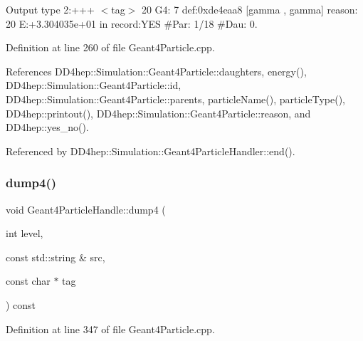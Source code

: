 Output type 2\+:+++ $<$tag$>$ 20 G4\+: 7 def\+:0xde4eaa8 \mbox{[}gamma , gamma\mbox{]} reason\+: 20 E\+:+3.304035e+01 in record\+:Y\+ES \#Par\+: 1/18 \#Dau\+: 0. 

Definition at line 260 of file Geant4\+Particle.\+cpp.



References D\+D4hep\+::\+Simulation\+::\+Geant4\+Particle\+::daughters, energy(), D\+D4hep\+::\+Simulation\+::\+Geant4\+Particle\+::id, D\+D4hep\+::\+Simulation\+::\+Geant4\+Particle\+::parents, particle\+Name(), particle\+Type(), D\+D4hep\+::printout(), D\+D4hep\+::\+Simulation\+::\+Geant4\+Particle\+::reason, and D\+D4hep\+::yes\+\_\+no().



Referenced by D\+D4hep\+::\+Simulation\+::\+Geant4\+Particle\+Handler\+::end().

\hypertarget{class_d_d4hep_1_1_simulation_1_1_geant4_particle_handle_ae1c9a4f9265e692704b8eeadac65f7e4}{}\label{class_d_d4hep_1_1_simulation_1_1_geant4_particle_handle_ae1c9a4f9265e692704b8eeadac65f7e4} 
\subsubsection{\texorpdfstring{dump4()}{dump4()}}
{\footnotesize\ttfamily void Geant4\+Particle\+Handle\+::dump4 (\begin{DoxyParamCaption}\item[{int}]{level,  }\item[{const std\+::string \&}]{src,  }\item[{const char $\ast$}]{tag }\end{DoxyParamCaption}) const}



Definition at line 347 of file Geant4\+Particle.\+cpp.



